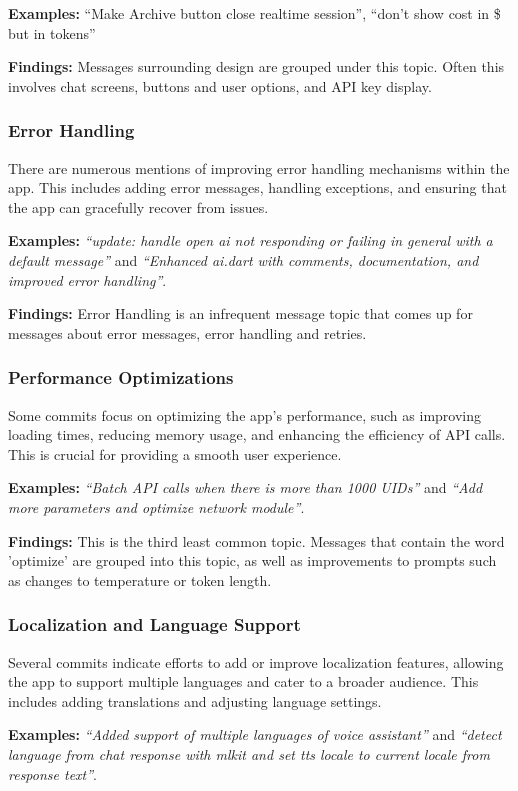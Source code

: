 \textbf{Examples: } ``Make Archive button close realtime session'', ``don't show cost in \$ but in tokens''

\textbf{Findings: } Messages surrounding design are grouped under this topic. Often this involves chat screens, buttons and user options, and API key display.

\subsubsection{Error Handling}
There are numerous mentions of improving error handling mechanisms within the app. This includes adding error messages, handling exceptions, and ensuring that the app can gracefully recover from issues.

\textbf{Examples: } \textit{``update: handle open ai not responding or failing in general with a default message''} and \textit{``Enhanced ai.dart with comments, documentation, and improved error handling''}.

\textbf{Findings: } Error Handling is an infrequent message topic that comes up for messages about error messages, error handling and retries.

\subsubsection{Performance Optimizations}
Some commits focus on optimizing the app's performance, such as improving loading times, reducing memory usage, and enhancing the efficiency of API calls. This is crucial for providing a smooth user experience.

\textbf{Examples: } \textit{``Batch API calls when there is more than 1000 UIDs''} and \textit{``Add more parameters and optimize network module''}.

\textbf{Findings: } This is the third least common topic. Messages that contain the word 'optimize' are grouped into this topic, as well as improvements to prompts such as changes to temperature or token length.

\subsubsection{Localization and Language Support}
Several commits indicate efforts to add or improve localization features, allowing the app to support multiple languages and cater to a broader audience. This includes adding translations and adjusting language settings.

\textbf{Examples: } \textit{``Added support of multiple languages of voice assistant''} and \textit{``detect language from chat response with mlkit and set tts locale to current locale from response text''}.

